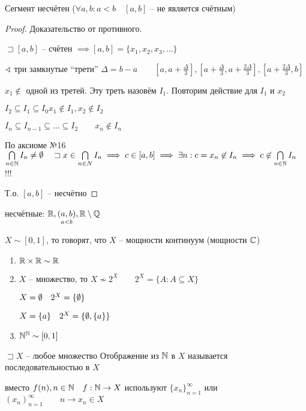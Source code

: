     \begin{theorem}
        Сегмент несчётен ($\forall a, b:a<b\quad [a,b]$ -- не является счётным)
    \end{theorem}
    \begin{proof}
        Доказательство от противного. 

        $\sqsupset [a,b]$ -- счётен $\implies [a,b] = \{x_1, x_2, x_3, \ldots\}$

        $\sphericalangle$ три замкнутые ``трети'' $\Delta = b-a\qquad [a,a+\frac{\Delta}{3}], [a + \frac{\Delta}{3}, a + \frac{2\Delta}{3}], [a + \frac{2\Delta}{3}, b] $

        $x_1 \not\in $ одной из третей. Эту треть назовём $I_1$. Повторим действие для $I_1$ и $x_2$

        $I_2\subseteq I_1 \subseteq I_0 x_1\not\in I_1, x_2\not\in I_2$

        $I_n\subseteq I_{n-1}\subseteq  \ldots \subseteq  I_2\qquad x_{n} \not\in I_n $

        По аксиоме №16 $\bigcap\limits_{n\in \mathbb{N} } I_n \neq \emptyset \quad \sqsupset x\in \bigcap\limits_{n\in N} I_n \implies c\in [a,b] \implies \exists n: c = x_n\not\in I_n \implies c\not\in \bigcap\limits_{n\in \mathbb{N} } I_n$ !!!

        Т.о. $[a,b]$ -- несчётно
    \end{proof}
    \begin{corollary}
        несчётные: $\mathbb{R}, \underset{a<b}{(a,b)}, \mathbb{R}\setminus \mathbb{Q}$

        $X\sim [0,1]$, то говорят, что $X$ -- мощности континуум (мощности $\mathbb{C}$)
    \end{corollary}
    \begin{problem}
         \begin{enumerate}
             \item 
        $\mathbb{R}\times\mathbb{R}\sim \mathbb{R}$
    \item $X$ -- множество, то $X\not\sim 2^X\qquad 2^X= \{A:A\subseteq X\}$

        $X = \emptyset \quad 2^X = \{\emptyset \}$

        $X = \{a\}\quad 2^X = \{\emptyset , \{a\}\}$
    \item $\mathbb{N} ^{\mathbb{N} }\sim [0,1]$
         \end{enumerate}
    \end{problem}

    \begin{definition}
        $\sqsupset X$ -- любое множество
        Отображение из $\mathbb{N} $ в $X$ называется последовательностью в $X$

        вместо $f(n), n\in \mathbb{N} \quad f:\mathbb{N} \to X$ используют $\{x_n\}_{n=1}^{\infty }$ или $\left( x_n \right) _{n=1}^{\infty }\qquad n\to x_n\in X$
    \end{definition}

